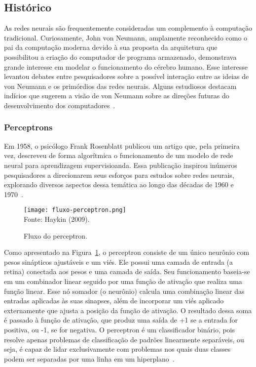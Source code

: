     \subsection{Histórico}
        As redes neurais são frequentemente consideradas um complemento à computação tradicional. Curiosamente, 
        John von Neumann, amplamente reconhecido como o pai da computação moderna devido à sua proposta da arquitetura 
        que possibilitou a criação do computador de programa armazenado, demonstrava grande interesse em modelar o 
        funcionamento do cérebro humano. Esse interesse levantou debates entre pesquisadores sobre a possível interação 
        entre as ideias de von Neumann e os primórdios das redes neurais. Alguns estudiosos destacam indícios que 
        sugerem a visão de von Neumann sobre as direções futuras do desenvolvimento dos computadores~\cite{Fausett1994}.

        \subsubsection{Perceptrons}
            
            Em 1958, o psicólogo Frank Rosenblatt publicou um artigo que, pela primeira vez, descreveu de forma 
            algorítmica o funcionamento de um modelo de rede neural para aprendizagem supervisioanda. Essa 
            publicação inspirou inúmeros pesquisadores a direcionarem seus esforços para estudos sobre redes neurais, 
            explorando diversos aspectos dessa temática ao longo das décadas de 1960 e 1970~\cite{haykin2009neural}.

            \begin{figure}[!htb]
                \centering
                \caption{Fluxo do perceptron.}
                \texttt{[image: fluxo-perceptron.png]}\\
                {\footnotesize Fonte: Haykin (2009).}\
                \label{fig:fluxo-perceptron}
            \end{figure}

            Como apresentado na Figura~\ref{fig:fluxo-perceptron}, o perceptron consiste de um único neurônio com 
            pesos sinápticos ajustáveis e um viés. Ele possui uma camada de entrada (a retina) conectada aos pesos e 
            uma camada de saída. Seu funcionamento baseia-se em um combinador linear seguido por uma função de 
            ativação que realiza uma função linear. Esse nó somador (o neurônio) calcula uma combinação linear das 
            entradas aplicadas às suas sinapses, além de incorporar um viés aplicado externamente que ajusta a posição
            da função de ativação. O resultado dessa soma é passado à função de ativação, que produz uma saída de +1 
            se a entrada for positiva, ou -1, se for negativa. O perceptron é um classificador binário, pois resolve 
            apenas problemas de classificação de padrões linearmente separáveis, ou seja, é capaz de lidar 
            exclusivamente com problemas nos quais duas classes podem ser separadas por uma 
            linha em um hiperplano~\cite{haykin2009neural}.



